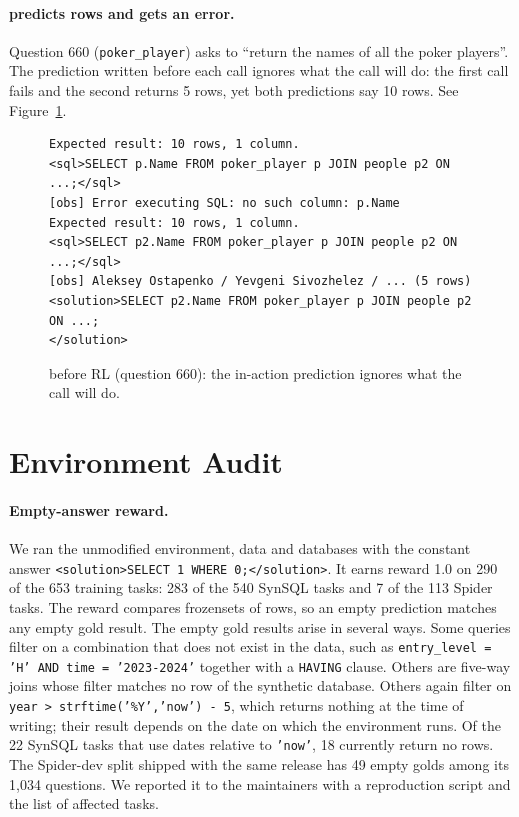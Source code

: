 \paragraph{\armF{} predicts rows and gets an error.}
Question 660 (\texttt{poker\_player}) asks to ``return the names of all the poker players''. The prediction written before each call ignores what the call will do: the first call fails and the second returns 5 rows, yet both predictions say 10 rows. See Figure~\ref{fig:tr660}.

\begin{figure}[t]
\begin{Verbatim}[frame=single,fontsize=\small,framesep=2mm,rulecolor=\color{black!35}]
Expected result: 10 rows, 1 column.
<sql>SELECT p.Name FROM poker_player p JOIN people p2 ON ...;</sql>
[obs] Error executing SQL: no such column: p.Name
Expected result: 10 rows, 1 column.
<sql>SELECT p2.Name FROM poker_player p JOIN people p2 ON ...;</sql>
[obs] Aleksey Ostapenko / Yevgeni Sivozhelez / ... (5 rows)
<solution>SELECT p2.Name FROM poker_player p JOIN people p2 ON ...;
</solution>
\end{Verbatim}
\caption{\armF{} before RL (question 660): the in-action prediction ignores what the call will do.}
\label{fig:tr660}
\end{figure}

\section{Environment Audit}
\label{app:audit}

\paragraph{Empty-answer reward.}
We ran the unmodified environment, data and databases with the constant answer \texttt{<solution>SELECT 1 WHERE 0;</solution>}. It earns reward 1.0 on 290 of the 653 training tasks: 283 of the 540 SynSQL tasks and 7 of the 113 Spider tasks. The reward compares frozensets of rows, so an empty prediction matches any empty gold result. The empty gold results arise in several ways. Some queries filter on a combination that does not exist in the data, such as \texttt{entry\_level = 'H' AND time = '2023-2024'} together with a \texttt{HAVING} clause. Others are five-way joins whose filter matches no row of the synthetic database. Others again filter on \texttt{year > strftime('\%Y','now') - 5}, which returns nothing at the time of writing; their result depends on the date on which the environment runs. Of the 22 SynSQL tasks that use dates relative to \texttt{'now'}, 18 currently return no rows. The Spider-dev split shipped with the same release has 49 empty golds among its 1,034 questions. We reported it to the maintainers with a reproduction script and the list of affected tasks\skyrlissue{}.

